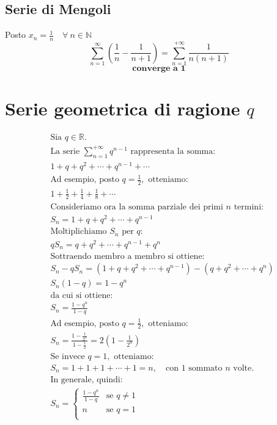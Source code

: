 \documentclass{article}
\begin{document}
\subsection*{Serie di Mengoli}
Posto $x_n = \frac{1}{n} \quad \forall\ n \in \mathbb{N}$
\[
\sum_{n=1}^{\infty} \left( \frac{1}{n} - \frac{1}{n+1} \right) = \sum_{n=1}^{+\infty} \frac{1}{n\left( n+1\right)}
\]
\[
\textbf{converge a 1}
\]

\section*{Serie geometrica di ragione $q$}
\begin{align*}
    &\text{Sia } q \in \mathbb{R}. \\ 
    &\text{La serie } \sum_{n=1}^{+\infty} q^{n-1} \text{ rappresenta la somma:} \\
    &1 + q + q^2 + \cdots + q^{n-1} + \cdots \\
    &\text{Ad esempio, posto } q = \frac{1}{2}, \text{ otteniamo:} \\
    &1 + \frac{1}{2} + \frac{1}{4} + \frac{1}{8} + \cdots \\
    &\text{Consideriamo ora la somma parziale dei primi } n \text{ termini:} \\
    &S_n = 1 + q + q^2 + \cdots + q^{n-1} \\
    &\text{Moltiplichiamo } S_n \text{ per } q: \\
    &q S_n = q + q^2 + \cdots + q^{n-1} + q^n \\
    &\text{Sottraendo membro a membro si ottiene:} \\
    &S_n - q S_n = (1 + q + q^2 + \cdots + q^{n-1}) - (q + q^2 + \cdots + q^n) \\
    &S_n (1 - q) = 1 - q^n \\
    &\text{da cui si ottiene:}\\
    & S_n = \frac{1 - q^n}{1 - q} \\
    &\text{Ad esempio, posto } q = \frac{1}{2}, \text{ otteniamo:} \\
    &S_n = \frac{1 - \frac{1}{2^n}}{1 - \frac{1}{2}} = 2 \left(1 - \frac{1}{2^n}\right) \\
    &\text{Se invece } q = 1, \text{ otteniamo:} \\
    &S_n = 1 + 1 + 1 + \cdots + 1 = n, \quad \text{con } 1 \text{ sommato } n \text{ volte}. \\
    &\text{In generale, quindi:} \\
    & S_n = 
    \begin{cases}
        \frac{1 - q^n}{1 - q} & \text{se } q \neq 1 \\
        n & \text{se } q = 1 \\
    \end{cases}
\end{align*}
\end{document}
